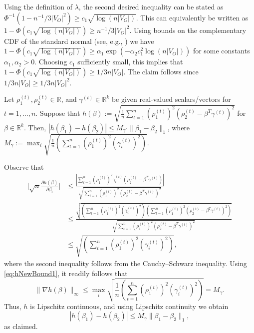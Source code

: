 \documentclass[opre,nonblindrev]{informs3} %
\begin{document}
\begin{APPENDIX}{}
 	Using the definition of $\lambda$, the second desired inequality can be stated as 
 	$\Phi^{-1}(1-n^{-1}/3|V_O|^2) \geq c_1 \sqrt{ \log{(n|V_O|)}}$. This can equivalently be written as 
 	$1- \Phi (c_1 \sqrt{ \log{(n|V_O|)} }) \geq n^{-1}/3|V_O|^2$.
 	Using bounds on the complementary CDF of the standard normal (see, e.g., \citet{chang2011chernoff})
 	we have $1- \Phi (c_1 \sqrt{ \log{(n|V_O|)}}) \geq \alpha_1 \exp(-\alpha_2 c_1^2  \log{(n|V_O|)} )$
 	for some constants $\alpha_1,\alpha_2>0$.
 	Choosing $c_1$ sufficiently small, this implies that
 	$1- \Phi (c_1 \sqrt{ \log{(n|V_O|)}}) \geq 1/3 n |V_O|$. The claim follows since 
 	$ 1/3 n |V_O| \geq 1/3n|V_O|^2 $.
 	\hfill \halmos
 	\endproof
 	
 	\begin{lemma}\label{lem:hBound}
 		Let $\rho_1^{(t)},\rho_2^{(t)}\in \mathbb{R}$, and $\gamma^{(t)}\in \mathbb{R}^k$ be given real-valued scalars/vectors for $t=1,\dots,n$.
 		Suppose that $h(\beta):=\sqrt{\frac{1}{n}\sum_{t=1}^n  (\rho_1^{(t)})^2(\rho_2^{(t)} -\beta^T \gamma^{(t)})^2} $ for $\beta\in \mathbb{R}^k$.
 		Then, $|h(\beta_1)-h(\beta_2)| \leq
 		M_\gamma \cdot
 		\|\beta_1-\beta_2\|_1 $,
 		where
 		$M_\gamma:= \max_i{\sqrt{\frac{1}{n}\left(\sum_{t=1}^n (\rho_1^{(t)})^2 (\gamma_i^{(t)})^2 \right) } }$.
 	\end{lemma}
 	Observe that
 	\begin{equation}\label{eq:hNewBound1}
 	\begin{aligned}
 	\Bigg| \sqrt{n} \frac{\partial h(\beta)}{\partial \beta_i}
 	\Bigg|
 	&\leq
 	\frac{|\sum_{t=1}^n(\rho_1^{(t)})^2\gamma_i^{(t)}(\rho_2^{(t)} -\beta^T \gamma^{(t)})|}{\sqrt{\sum_{t=1}^n  (\rho_1^{(t)})^2(\rho_2^{(t)} -\beta^T \gamma^{(t)})^2}}\\
 	&\leq
 	\frac{\sqrt{\left(\sum_{t=1}^n (\rho_1^{(t)})^2 (\gamma_i^{(t)})^2 \right)
 			\left( \sum_{t=1}^n
 			(\rho_1^{(t)})^2	(\rho_2^{(t)} -\beta^T \gamma^{(t)})^2
 			\right)	} }{\sqrt{ \sum_{t=1}^n  (\rho_1^{(t)})^2(\rho_2^{(t)} -\beta^T \gamma^{(t)})^2}}\\
 	& \leq
 	{\sqrt{\left(\sum_{t=1}^n (\rho_1^{(t)})^2 (\gamma_i^{(t)})^2 \right) } },
 	\end{aligned}	
 	\end{equation}
 	where the second inequality follows from the Cauchy--Schwarz inequality.
 	Using \eqref{eq:hNewBound1}, it readily follows that
 	\begin{equation}
 	\| \nabla h(\beta)\|_\infty\leq
 	\max_i{\sqrt{\frac{1}{n}\left(\sum_{t=1}^n (\rho_1^{(t)})^2 (\gamma_i^{(t)})^2 \right) } }=M_\gamma.
 	\end{equation}
 	Thus, $h$ is Lipschitz continuous, and using Lipschitz continuity we obtain
 	\begin{equation}
 	|h(\beta_1)-h(\beta_2)| \leq M_\gamma \|\beta_1-\beta_2\|_1,
 	\end{equation}
 	as claimed. \hfill \halmos
 	\endproof
 	

\end{APPENDIX}
\end{document}
